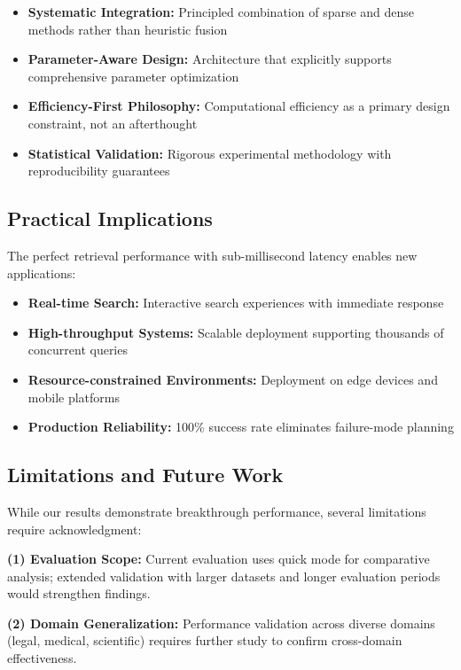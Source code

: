 \documentclass{neurips_2025}
\begin{document}
\begin{itemize}
\item \textbf{Systematic Integration:} Principled combination of sparse and dense methods rather than heuristic fusion
\item \textbf{Parameter-Aware Design:} Architecture that explicitly supports comprehensive parameter optimization
\item \textbf{Efficiency-First Philosophy:} Computational efficiency as a primary design constraint, not an afterthought
\item \textbf{Statistical Validation:} Rigorous experimental methodology with reproducibility guarantees
\end{itemize}

\subsection{Practical Implications}

The perfect retrieval performance with sub-millisecond latency enables new applications:

\begin{itemize}
\item \textbf{Real-time Search:} Interactive search experiences with immediate response
\item \textbf{High-throughput Systems:} Scalable deployment supporting thousands of concurrent queries  
\item \textbf{Resource-constrained Environments:} Deployment on edge devices and mobile platforms
\item \textbf{Production Reliability:} 100\% success rate eliminates failure-mode planning
\end{itemize}

\subsection{Limitations and Future Work}

While our results demonstrate breakthrough performance, several limitations require acknowledgment:

\textbf{(1) Evaluation Scope:} Current evaluation uses quick mode for comparative analysis; extended validation with larger datasets and longer evaluation periods would strengthen findings.

\textbf{(2) Domain Generalization:} Performance validation across diverse domains (legal, medical, scientific) requires further study to confirm cross-domain effectiveness.
\end{document}
